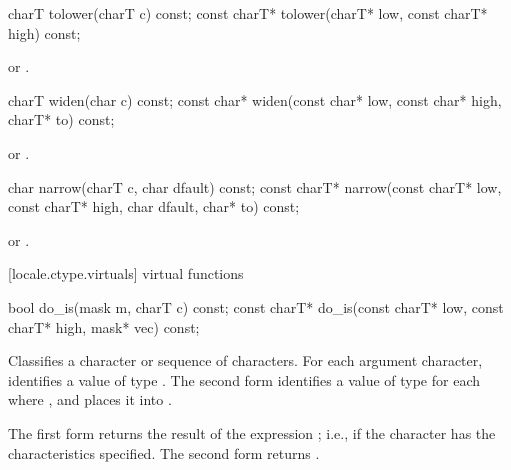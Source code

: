 %
\begin{itemdecl}
charT        tolower(charT c) const;
const charT* tolower(charT* low, const charT* high) const;
\end{itemdecl}

\begin{itemdescr}
\pnum
\returns
{}
or
.
\end{itemdescr}

%
\begin{itemdecl}
charT       widen(char c) const;
const char* widen(const char* low, const char* high, charT* to) const;
\end{itemdecl}

\begin{itemdescr}
\pnum
\returns
{}
or
.
\end{itemdescr}

%
\begin{itemdecl}
char         narrow(charT c, char dfault) const;
const charT* narrow(const charT* low, const charT* high, char dfault,
                    char* to) const;
\end{itemdecl}

\begin{itemdescr}
\pnum
\returns
{}
or
.
\end{itemdescr}

[locale.ctype.virtuals]{ virtual functions}

%
\begin{itemdecl}
bool         do_is(mask m, charT c) const;
const charT* do_is(const charT* low, const charT* high,
                   mask* vec) const;
\end{itemdecl}

\begin{itemdescr}
\pnum
\effects
Classifies a character or sequence of characters.
For each argument character, identifies a value
of type
.
The second form identifies a value  of type
for each
where
,
and places it into
.

\pnum
\returns
The first form returns the result of the expression
;
i.e.,
if the character has the characteristics specified.
The second form returns .
\end{itemdescr}

